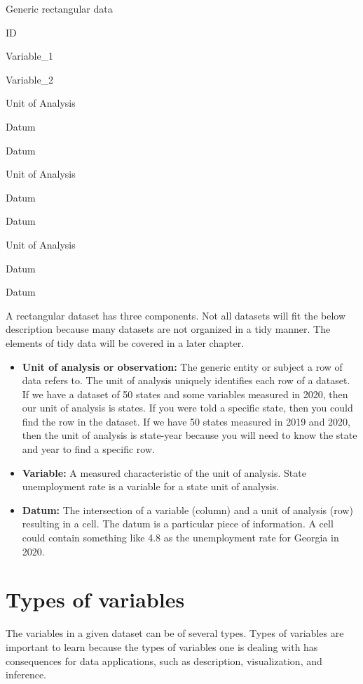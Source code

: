 \documentclass[
]{book}
\providecommand{\tightlist}{%
  \setlength{\itemsep}{0pt}\setlength{\parskip}{0pt}}
\begin{document}
\label{tab:print-generic}Generic rectangular data

ID

Variable\_1

Variable\_2

Unit of Analysis

Datum

Datum

Unit of Analysis

Datum

Datum

Unit of Analysis

Datum

Datum

A rectangular dataset has three components. Not all datasets will fit the below description because many datasets are not organized in a tidy manner. The elements of tidy data will be covered in a later chapter.

\begin{itemize}
\tightlist
\item
  \textbf{Unit of analysis or observation:} The generic entity or subject a row of data refers to. The unit of analysis uniquely identifies each row of a dataset. If we have a dataset of 50 states and some variables measured in 2020, then our unit of analysis is states. If you were told a specific state, then you could find the row in the dataset. If we have 50 states measured in 2019 and 2020, then the unit of analysis is state-year because you will need to know the state and year to find a specific row.
\item
  \textbf{Variable:} A measured characteristic of the unit of analysis. State unemployment rate is a variable for a state unit of analysis.
\item
  \textbf{Datum:} The intersection of a variable (column) and a unit of analysis (row) resulting in a cell. The datum is a particular piece of information. A cell could contain something like 4.8 as the unemployment rate for Georgia in 2020.
\end{itemize}

\hypertarget{types-of-variables}{%
\section{Types of variables}\label{types-of-variables}}

The variables in a given dataset can be of several types. Types of variables are important to learn because the types of variables one is dealing with has consequences for data applications, such as description, visualization, and inference.
\end{document}
